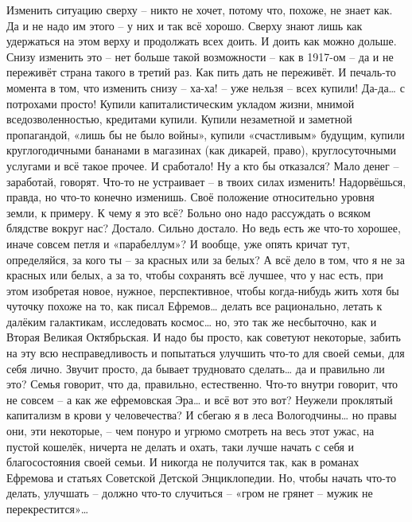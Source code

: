 Изменить ситуацию сверху – никто не хочет, потому что, похоже, не знает как. Да и не надо им этого – у них и так всё хорошо. Сверху знают лишь как удержаться на этом верху и продолжать всех доить. И доить как можно дольше. Снизу изменить это – нет больше такой возможности – как в 1917-ом – да и не переживёт страна такого в третий раз. Как пить дать не переживёт. И печаль-то момента в том, что изменить снизу – ха-ха! – уже нельзя – всех купили! Да-да… с потрохами просто! Купили капиталистическим укладом жизни, мнимой вседозволенностью, кредитами купили. Купили незаметной и заметной пропагандой, «лишь бы не было войны», купили «счастливым» будущим, купили круглогодичными бананами в магазинах (как дикарей, право), круглосуточными услугами и всё такое прочее. И сработало! Ну а кто бы отказался? Мало денег – заработай, говорят. Что-то не устраивает – в твоих силах изменить! Надорвёшься, правда, но что-то конечно изменишь. Своё положение относительно уровня земли, к примеру.
К чему я это всё? Больно оно надо рассуждать о всяком блядстве вокруг нас? Достало. Сильно достало. Но ведь есть же что-то хорошее, иначе совсем петля и «парабеллум»? И вообще, уже опять кричат тут, определяйся, за кого ты – за красных или за белых? А всё дело в том, что я не за красных или белых, а за то, чтобы сохранять всё лучшее, что у нас есть, при этом изобретая новое, нужное, перспективное, чтобы когда-нибудь жить хотя бы чуточку похоже на то, как писал Ефремов… делать все рационально, летать к далёким галактикам, исследовать космос… но, это так же несбыточно, как и Вторая Великая Октябрьская. И надо бы просто, как советуют некоторые, забить на эту всю несправедливость и попытаться улучшить что-то для своей семьи, для себя лично. Звучит просто, да бывает трудновато сделать… да и правильно ли это? Семья говорит, что да, правильно, естественно. Что-то внутри говорит, что не совсем – а как же ефремовская Эра… и всё вот это вот? Неужели проклятый капитализм в крови у человечества? И сбегаю я в леса Вологодчины… но правы они, эти некоторые, – чем понуро и угрюмо смотреть на весь этот ужас, на пустой кошелёк, ничерта не делать и охать, таки лучше начать с себя и благосостояния своей семьи. И никогда не получится так, как в романах Ефремова и статьях Советской Детской Энциклопедии. Но, чтобы начать что-то делать, улучшать – должно что-то случиться – «гром не грянет – мужик не перекрестится»… 
